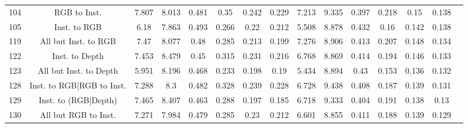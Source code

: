 \begin{table}
\begin{tabular}{@{\hskip3pt}c@{\hskip3pt}c@{\hskip3pt}c@{\hskip3pt}c@{\hskip3pt}c@{\hskip3pt}c@{\hskip3pt}c@{\hskip3pt}c@{\hskip3pt}c@{\hskip3pt}c@{\hskip3pt}c@{\hskip3pt}c@{\hskip3pt}c@{\hskip3pt}c@{\hskip3pt}c}
                                          104 &                        RGB to Inst. &             7.807 &          8.013 &           0.481 &            0.35 &           0.242 &           0.229 &               7.213 &         9.335 &           0.397 &           0.218 &            0.15 &           0.138 \\
                                          105 &                        Inst. to RGB &              6.18 &          7.863 &           0.493 &           0.266 &            0.22 &           0.212 &               5.508 &         8.878 &           0.432 &            0.16 &           0.142 &           0.138 \\
                                          119 &                All but Inst. to RGB &              7.47 &          8.077 &            0.48 &           0.285 &           0.213 &           0.199 &               7.276 &         8.906 &           0.413 &           0.207 &           0.148 &           0.134 \\
                                          122 &                      Inst. to Depth &             7.453 &          8.479 &            0.45 &           0.315 &           0.231 &           0.216 &               6.768 &         8.869 &           0.414 &           0.194 &           0.146 &           0.133 \\
                                          123 &              All but Inst. to Depth &             5.951 &          8.196 &           0.468 &           0.233 &           0.198 &            0.19 &               5.434 &         8.894 &            0.43 &           0.153 &           0.136 &           0.132 \\
                                          128 &           Inst. to RGB|RGB to Inst. &             7.288 &            8.3 &           0.482 &           0.328 &           0.239 &           0.228 &               6.728 &         9.438 &           0.408 &           0.187 &           0.139 &           0.131 \\
                                          129 &                Inst. to (RGB|Depth) &             7.465 &          8.407 &           0.463 &           0.288 &           0.197 &           0.185 &               6.718 &         9.333 &           0.404 &           0.191 &           0.138 &            0.13 \\
                                          130 &                All but RGB to Inst. &             7.271 &          7.984 &           0.479 &           0.285 &            0.23 &           0.212 &               6.601 &         8.855 &           0.411 &           0.188 &           0.139 &           0.129 \\

\end{tabular}
\end{table}
